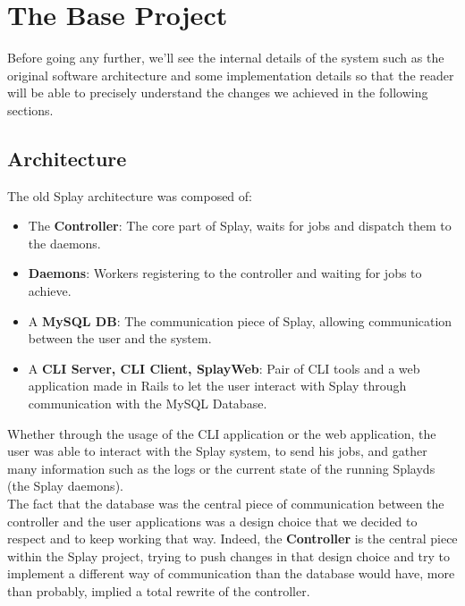 \documentclass{eplmastersthesis}
\begin{document}
    \section{The Base Project}

      Before going any further, we'll see the internal details of the system
      such as the original software architecture and some implementation
      details so that the reader will be able to precisely understand the
      changes we achieved in the following sections.

      \subsection{Architecture}

        The old Splay architecture was composed of:

        \begin{itemize}
          \item The \textbf{Controller}: The core part of Splay, waits for jobs
          and dispatch them to the daemons.
          \item \textbf{Daemons}: Workers registering to the controller and waiting
          for jobs to achieve.
          \item A \textbf{MySQL DB}: The communication piece of Splay, allowing
          communication between the user and the system.
          \item A \textbf{CLI Server, CLI Client, SplayWeb}: Pair of CLI tools
          and a web application made in Rails to let the user interact with
          Splay through communication with the MySQL Database.
        \end{itemize}

        Whether through the usage of the CLI application or the web application,
        the user was able to interact with the Splay system, to send his
        jobs, and gather many information such as the logs or the current
        state of the running Splayds (the Splay daemons).\\

        The fact that the database was the central piece of communication
        between the controller and the user applications was a design choice
        that we decided to respect and to keep working that way. Indeed, the
        \textbf{Controller} is the central piece within the Splay project,
        trying to push changes in that design choice and try to implement a
        different way of communication than the database would have, more
        than probably, implied a total rewrite of the controller.\\
\end{document}
